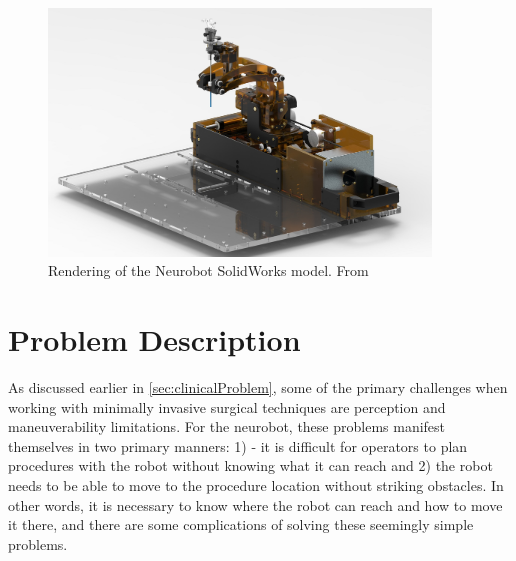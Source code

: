 \documentclass[12pt]{report}
\begin{document}
\begin{figure}[thpb]
	\centering
	\includegraphics[width = 4in]{images/NeuroRobot_complete_26_reduced.jpg}
    \caption{Rendering of the Neurobot SolidWorks model. From \cite{neurobotIros}}
    \label{fig:neuroRVizModel}
\end{figure}


\section{Problem Description}
\label{sec:problemDescription}
As discussed earlier in \autoref{sec:clinicalProblem}, some of the primary challenges when working with minimally invasive surgical techniques are perception and maneuverability limitations. For the neurobot, these problems manifest themselves in two primary manners: 1) - it is difficult for operators to plan procedures with the robot without knowing what it can reach and 2) the robot needs to be able to move to the procedure location without striking obstacles. In other words, it is necessary to know where the robot can reach and how to move it there, and there are some complications of solving these seemingly simple problems. 
\end{document}
